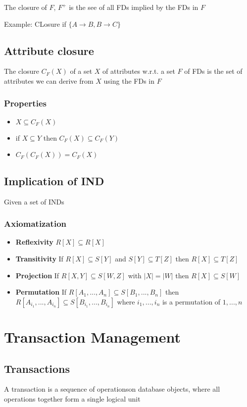 \documentclass{article}
\begin{document}
The closure of $F$, $F^+$ is the see of all FDs implied by the FDs in $F$

Example: CLosure if $\{A \rightarrow B, B \rightarrow C\}$

\subsection{Attribute closure}
The closure $C_F(X)$ of a set $X$ of attributes w.r.t. a set $F$ of FDs is the set of attributes we can derive from $X$ using the FDs in $F$
\subsubsection*{Properties}
\begin{itemize}
  \item $X \subseteq C_F(X)$
  \item if $X \subseteq Y$ then $C_F(X) \subseteq C_F(Y)$
  \item $C_F(C_F(X)) = C_F(X)$
\end{itemize}

\subsection{Implication of IND}
Given a set of INDs

\subsubsection*{Axiomatization}
\begin{itemize}
  \item \textbf{Reflexivity} $R[X] \subseteq R[X]$
  \item \textbf{Transitivity} If $R[X] \subseteq S[Y]$ and $S[Y] \subseteq T[Z]$ then $R[X] \subseteq T[Z]$
  \item \textbf{Projection} If $R[X,Y] \subseteq S[W,Z]$ with $|X| = |W|$ then $R[X] \subseteq S[W]$
  \item \textbf{Permutation} If $R[A_1,...,A_n] \subseteq S[B_1,...,B_n]$ then $R[A_{i_1},...,A_{i_n}] \subseteq S[B_{i_1},...,B_{i_n}]$ where $i_1,...,i_n$ is a permutation of $1,...,n$
\end{itemize}

\section{Transaction Management}
\subsection{Transactions}
A transaction is a sequence of operationson database objects, where all operations together form a single logical unit
\end{document}
